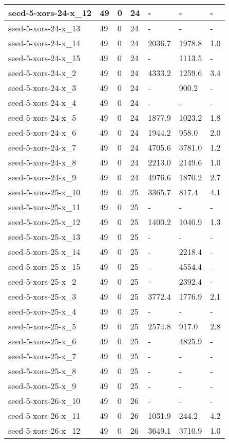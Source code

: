 \begin{scriptsize}
\begin{longtable}{|p{5cm}|l|l|l|l|l|l|}
seed-5-xors-24-x\_12&49&0&24&-&-&- \\ \hline 
seed-5-xors-24-x\_13&49&0&24&-&-&- \\ \hline 
seed-5-xors-24-x\_14&49&0&24&2036.7&1978.8&1.0 \\ \hline 
seed-5-xors-24-x\_15&49&0&24&-&1113.5&- \\ \hline 
seed-5-xors-24-x\_2&49&0&24&4333.2&1259.6&3.4 \\ \hline 
seed-5-xors-24-x\_3&49&0&24&-&900.2&- \\ \hline 
seed-5-xors-24-x\_4&49&0&24&-&-&- \\ \hline 
seed-5-xors-24-x\_5&49&0&24&1877.9&1023.2&1.8 \\ \hline 
seed-5-xors-24-x\_6&49&0&24&1944.2&958.0&2.0 \\ \hline 
seed-5-xors-24-x\_7&49&0&24&4705.6&3781.0&1.2 \\ \hline 
seed-5-xors-24-x\_8&49&0&24&2213.0&2149.6&1.0 \\ \hline 
seed-5-xors-24-x\_9&49&0&24&4976.6&1870.2&2.7 \\ \hline 
seed-5-xors-25-x\_10&49&0&25&3365.7&817.4&4.1 \\ \hline 
seed-5-xors-25-x\_11&49&0&25&-&-&- \\ \hline 
seed-5-xors-25-x\_12&49&0&25&1400.2&1040.9&1.3 \\ \hline 
seed-5-xors-25-x\_13&49&0&25&-&-&- \\ \hline 
seed-5-xors-25-x\_14&49&0&25&-&2218.4&- \\ \hline 
seed-5-xors-25-x\_15&49&0&25&-&4554.4&- \\ \hline 
seed-5-xors-25-x\_2&49&0&25&-&2392.4&- \\ \hline 
seed-5-xors-25-x\_3&49&0&25&3772.4&1776.9&2.1 \\ \hline 
seed-5-xors-25-x\_4&49&0&25&-&-&- \\ \hline 
seed-5-xors-25-x\_5&49&0&25&2574.8&917.0&2.8 \\ \hline 
seed-5-xors-25-x\_6&49&0&25&-&4825.9&- \\ \hline 
seed-5-xors-25-x\_7&49&0&25&-&-&- \\ \hline 
seed-5-xors-25-x\_8&49&0&25&-&-&- \\ \hline 
seed-5-xors-25-x\_9&49&0&25&-&-&- \\ \hline 
seed-5-xors-26-x\_10&49&0&26&-&-&- \\ \hline 
seed-5-xors-26-x\_11&49&0&26&1031.9&244.2&4.2 \\ \hline 
seed-5-xors-26-x\_12&49&0&26&3649.1&3710.9&1.0 \\ \hline 

\end{longtable}
\end{scriptsize}
